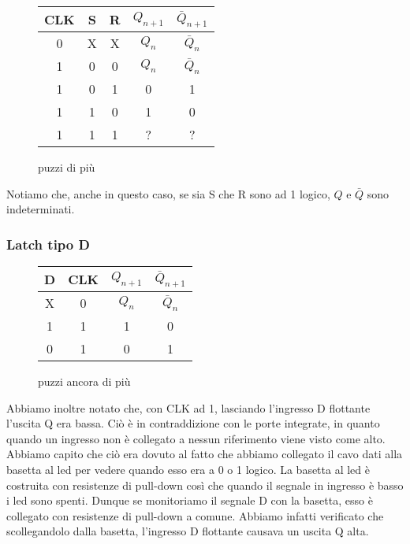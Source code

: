 \begin{figure}[H]
		\centering
		{\renewcommand{\arraystretch}{1.1}%
		\begin{tabular}{|c||c|c|c|c|}
		\hline
		CLK & S & R & $Q_{n+1}$ & $\bar Q_{n+1}$  \\
		\hline \hline
		0 & X & X & $Q_n$ & $\bar Q_n$\\
		\hline \hline
		 1&0 & 0 & $Q_n$ & $\bar Q_n$\\
		\hline
		1&0 & 1 & 0 &1\\
		\hline
		1&1 & 0 & 1 & 0\\
		\hline
		1&1 & 1 & ? & ?\\
		\hline
		\end{tabular}}
		\label{tab11:FFSR}
		\caption{puzzi di più}
        \end{figure}

Notiamo che, anche in questo caso, se sia S che R sono ad 1 logico, $Q$ e $\bar Q$ sono indeterminati.

\subsubsection*{Latch tipo D}


\begin{figure}[H]
		\centering
		{\renewcommand{\arraystretch}{1.1}%
		\begin{tabular}{c|c|c|c}
		D & CLK & $Q_{n+1}$ & $\bar Q_{n+1}$  \\
		\hline
		X & 0  & $Q_n$ & $\bar Q_n$\\
		\hline
		 1&1 & 1 & 0\\
		\hline
		0&1 & 0  &1\\
		\end{tabular}}
		\label{tab11:Latch_D}
		\caption{puzzi ancora di più}
        \end{figure}

Abbiamo inoltre notato che, con CLK ad 1, lasciando l'ingresso D flottante l'uscita Q era bassa. Ciò è in contraddizione con le porte integrate, in quanto quando un ingresso non è collegato a nessun riferimento viene visto come alto. Abbiamo capito che ciò era dovuto al fatto che abbiamo collegato il cavo dati alla basetta al led per vedere quando esso era a 0 o 1 logico. La basetta al led è costruita con resistenze di pull-down così che quando il segnale in ingresso è basso i led sono spenti. Dunque se monitoriamo il segnale D con la basetta, esso è collegato con resistenze di pull-down a comune. Abbiamo infatti verificato che scollegandolo dalla basetta, l'ingresso D flottante causava un uscita Q alta.

